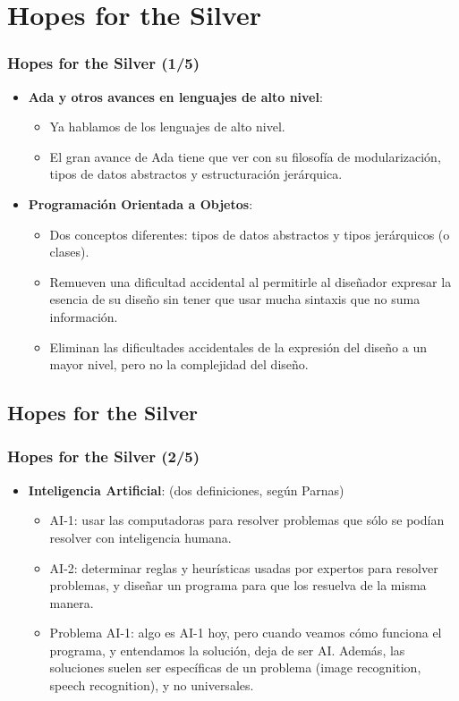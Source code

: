 \documentclass{beamer}
\begin{document}
\section{Hopes for the Silver}
\begin{frame}
  \frametitle{Hopes for the Silver (1/5)}
  \begin{itemize}
    \item \textbf{Ada y otros avances en lenguajes de alto nivel}:
      \begin{itemize}
	\item Ya hablamos de los lenguajes de alto nivel.
	\item El gran avance de Ada tiene que ver con su filosofía de modularización, tipos de datos abstractos y estructuración jerárquica. 
      \end{itemize}
    \item \textbf{Programación Orientada a Objetos}:
      \begin{itemize}
	\item Dos conceptos diferentes: tipos de datos abstractos y tipos jerárquicos (o clases).
	\item Remueven una dificultad accidental al permitirle al diseñador expresar la esencia de su diseño sin tener que usar mucha sintaxis que no suma información.
	\item Eliminan las dificultades accidentales de la expresión del diseño a un mayor nivel, pero no la complejidad del diseño.
      \end{itemize}
\end{itemize}
\end{frame}

\subsection*{Hopes for the Silver}
\begin{frame}
  \frametitle{Hopes for the Silver (2/5)}      
  \begin{itemize}
    \item \textbf{Inteligencia Artificial}: (dos definiciones, según Parnas)
      \begin{itemize}
	\item AI-1: usar las computadoras para resolver problemas que sólo se podían resolver con inteligencia humana.
	\item AI-2: determinar reglas y heurísticas usadas por expertos para resolver problemas, y diseñar un programa para que los resuelva de la misma manera.
	\item Problema AI-1: algo es AI-1 hoy, pero cuando veamos cómo funciona el programa, y entendamos la solución, deja de ser AI. Además, las soluciones suelen ser específicas de un problema (image recognition, speech recognition), y no universales.
      \end{itemize}
  \end{itemize}
\end{frame}
\end{document}
